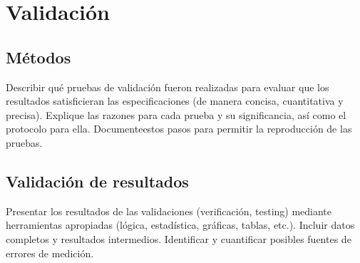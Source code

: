 \section{Validación}

\subsection{Métodos}
Describir qué pruebas de validación fueron realizadas para evaluar que los resultados satisficieran las especificaciones (de manera concisa, cuantitativa y precisa). Explique las razones para cada prueba y su significancia, así como el protocolo para ella. Documenteestos pasos para permitir la reproducción de las pruebas.

\subsection{Validación de resultados}
Presentar los resultados de las validaciones (verificación, testing)  mediante herramientas apropiadas (lógica, estadística, gráficas, tablas, etc.). Incluir datos completos y resultados intermedios. Identificar y cuantificar posibles fuentes de errores de medición.